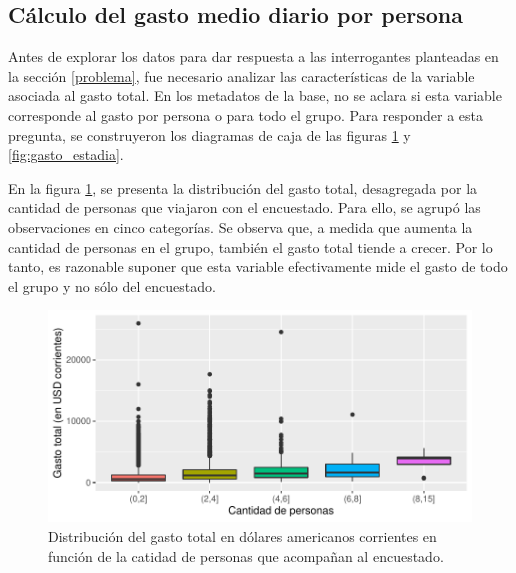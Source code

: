 \documentclass[
]{article}
\begin{document}
\hypertarget{cuxe1lculo-del-gasto-medio-diario-por-persona}{%
\subsection{\texorpdfstring{Cálculo del gasto medio diario por persona
\label{calculo_gasto}}{Cálculo del gasto medio diario por persona }}\label{cuxe1lculo-del-gasto-medio-diario-por-persona}}

Antes de explorar los datos para dar respuesta a las interrogantes
planteadas en la sección \ref{problema}, fue necesario analizar las
características de la variable asociada al gasto total. En los metadatos
de la base, no se aclara si esta variable corresponde al gasto por
persona o para todo el grupo. Para responder a esta pregunta, se
construyeron los diagramas de caja de las figuras
\ref{fig:gasto_personas} y \ref{fig:gasto_estadia}.

En la figura \ref{fig:gasto_personas}, se presenta la distribución del
gasto total, desagregada por la cantidad de personas que viajaron con el
encuestado. Para ello, se agrupó las observaciones en cinco categorías.
Se observa que, a medida que aumenta la cantidad de personas en el
grupo, también el gasto total tiende a crecer. Por lo tanto, es
razonable suponer que esta variable efectivamente mide el gasto de todo
el grupo y no sólo del encuestado.

\begin{figure}[H]

{\centering \includegraphics{Informe-Proyectofinal_files/figure-latex/gasto_personas-1} 

}

\caption{Distribución del gasto total en dólares americanos corrientes en función de la catidad de personas que acompañan al encuestado.}\label{fig:gasto_personas}
\end{figure}
\end{document}
